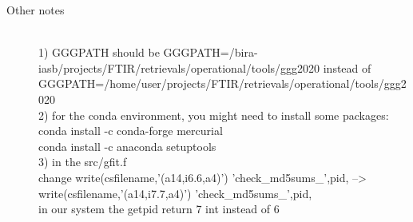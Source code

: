 \documentclass{article}
\begin{document}
\begin{description}
\item[Other notes]\hfill \\
1) GGGPATH should be GGGPATH=/bira-iasb/projects/FTIR/retrievals/operational/tools/ggg2020 instead of GGGPATH=/home/user/projects/FTIR/retrievals/operational/tools/ggg2020\\
2) for the conda environment, you might need to install some packages:\\
conda install -c conda-forge mercurial\\
conda install -c anaconda setuptools\\
3) in the src/gfit.f\\
change write(csfilename,'(a14,i6.6,a4)') 'check\_md5sums\_',pid,    -->     write(csfilename,'(a14,i7.7,a4)') 'check\_md5sums\_',pid,\\
in our system the getpid return 7 int instead of 6\\


\end{description}
\end{document}
